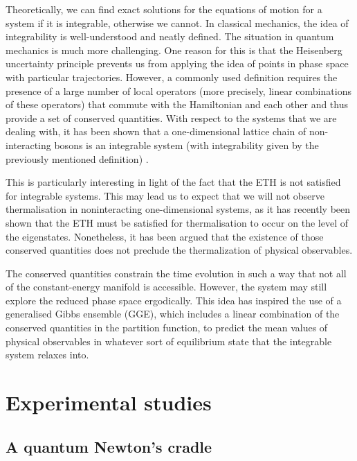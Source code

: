\documentclass[a4paper, 10pt]{article}
\theoremstyle{plain}
\begin{document}
Theoretically, we can find exact solutions for the equations of motion for a
system if it is integrable, otherwise we cannot. In classical mechanics, the
idea of integrability is well-understood and neatly defined. The situation in
quantum mechanics is much more challenging. One reason for this is that
the Heisenberg uncertainty principle prevents us from applying the idea of
points in phase space with particular trajectories. However, a commonly 
used definition requires the presence of a large number of local operators (more
precisely, linear combinations of these operators) that commute with the 
Hamiltonian and each other and thus provide a set of conserved quantities. With 
respect to the systems that we are dealing with, it has been shown that a 
one-dimensional lattice chain of non-interacting bosons is an integrable 
system (with integrability given by the previously mentioned 
definition) \cite{Rigol2007}.

This is particularly interesting in light of the fact that the ETH is not 
satisfied for integrable systems. This may lead us to expect that we will 
not observe thermalisation in noninteracting one-dimensional systems, as it 
has recently been shown that the ETH must be satisfied for thermalisation to 
occur \cite{Palma2015} on the level of the eigenstates. Nonetheless, it has 
been argued \cite{DAlessio2016} that the existence of those conserved 
quantities does not preclude the thermalization of physical observables. 

The conserved quantities constrain the time evolution in such a way that not 
all of the constant-energy manifold is accessible. However, the system may 
still explore the reduced phase space ergodically. This idea has inspired 
the use of a generalised Gibbs ensemble (GGE), which includes a linear 
combination of the conserved quantities in the partition function, to predict 
the mean values of physical observables in whatever sort of equilibrium 
state that the integrable system relaxes into.

\section{Experimental studies}

\subsection{A quantum Newton's cradle}
\end{document}
